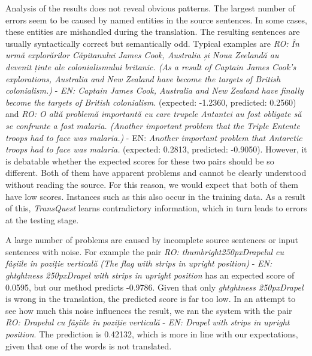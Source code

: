 Analysis of the results does not reveal obvious patterns. The largest number of errors seem to be caused by named entities in the source sentences. In some cases, these entities are mishandled during the translation. The resulting sentences are usually syntactically correct but semantically odd. Typical examples are \emph{RO: În urmă explorărilor Căpitanului James Cook, Australia și Noua Zeelandă au devenit ținte ale colonialismului britanic. (As a result of Captain James Cook's explorations, Australia and New Zealand have  become the targets of British colonialism.)} - \emph{EN: Captain James Cook, Australia and New Zealand have finally become the targets of British colonialism.} (expected: -1.2360, predicted: 0.2560) and \emph{RO: O altă problemă importantă cu care trupele Antantei au fost obligate să se confrunte a fost malaria. (Another important problem that the Triple Entente troops had to face was malaria.)} - EN: \emph{Another important problem that Antarctic troops had to face was malaria.} (expected: 0.2813, predicted: -0.9050). 
However, it is debatable whether the expected scores for these two pairs should be so different. Both of them have apparent problems and cannot be clearly understood without reading the source. For this reason, we would expect that both of them have low scores. Instances such as this also occur in the training data. As a result of this, \textit{TransQuest} learns contradictory information, which in turn leads to errors at the testing stage.

A large number of problems are caused by incomplete source sentences or input sentences with noise. For example the pair \emph{RO: thumbright250pxDrapelul cu fâșiile în poziție verticală (The flag with strips in upright position)} -  \emph{EN: ghtghtness 250pxDrapel with strips in upright position} has an expected score of 0.0595, but our method predicts -0.9786. Given that only \emph{ghtghtness 250pxDrapel} is wrong in the translation, the predicted score is far too low. In an attempt to see how much this noise influences the result, we ran the system with the pair \emph{RO: Drapelul cu fâșiile în poziție verticală} -  \emph{EN: Drapel with strips in upright position}. The prediction is 0.42132, which is more in line with our expectations, given that one of the words is not translated. 

